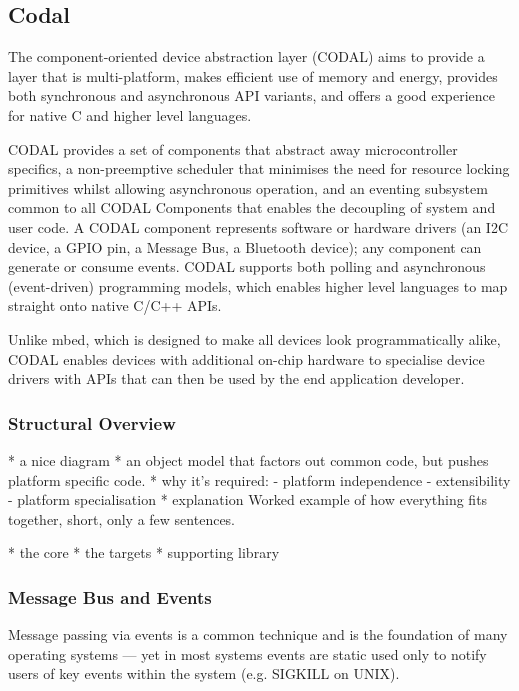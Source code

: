 \subsection{Codal}

The component-oriented device abstraction layer (CODAL) aims to provide a layer that is multi-platform, makes efficient use of memory and energy, provides both synchronous and asynchronous API variants, and offers a good experience for native C and higher level languages.

CODAL provides a set of components that abstract away microcontroller specifics, a non-preemptive scheduler that minimises the need for resource locking primitives whilst allowing asynchronous operation, and an eventing subsystem common to all CODAL Components that enables the decoupling of system and user code. A CODAL component represents software or hardware drivers (an I2C device, a GPIO pin, a Message Bus, a Bluetooth device); any component can generate or consume events. CODAL supports both polling and asynchronous (event-driven) programming models, which enables higher level languages to map straight onto native C/C++ APIs.

Unlike mbed, which is designed to make all devices look programmatically alike, CODAL enables devices with additional on-chip hardware to specialise device drivers with APIs that can then be used by the end application developer.


\subsubsection{Structural Overview}

* a nice diagram
* an object model that factors out common code, but pushes platform specific code.
* why it's required:
    - platform independence
    - extensibility
    - platform specialisation
* explanation
Worked example of how everything fits together, short, only a few sentences.

* the core
* the targets
* supporting library

\subsubsection{Message Bus and Events}

Message passing via events is a common technique and is the foundation of many operating systems --- yet in most systems events are static used only to notify users of key events within the system (e.g. SIGKILL on UNIX).

